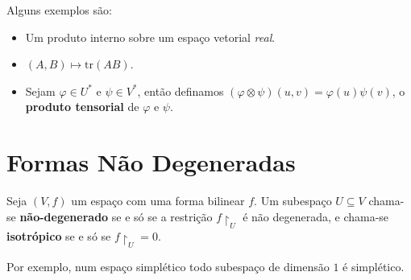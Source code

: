 \documentclass[11pt,twoside,a4paper]{book}
\begin{document}
\begin{exemplo}
Alguns exemplos são:
\begin{itemize}
\item Um produto interno sobre um espaço vetorial \textit{real}.
\item $(A,B)\mapsto\mathrm{tr}(AB)$.
\item Sejam $\varphi\in U^*$ e $\psi\in V^*$, então definamos $(\varphi\otimes\psi)(u,v)=\varphi(u)\psi(v)$, o \textbf{produto tensorial} de $\varphi$ e $\psi$.
\end{itemize}
\end{exemplo}

\section{Formas Não Degeneradas}

\begin{definicao}
Seja $(V,f)$ um espaço com uma forma bilinear $f$. Um subespaço $U\subseteq V$ chama-se \textbf{não-degenerado} se e só se a restrição $f\upharpoonright_U$ é não degenerada, e chama-se \textbf{isotrópico} se e só se $f\upharpoonright_U=0$.
\end{definicao}

\noindent
Por exemplo, num espaço simplético todo subespaço de dimensão $1$ é simplético.
\end{document}
